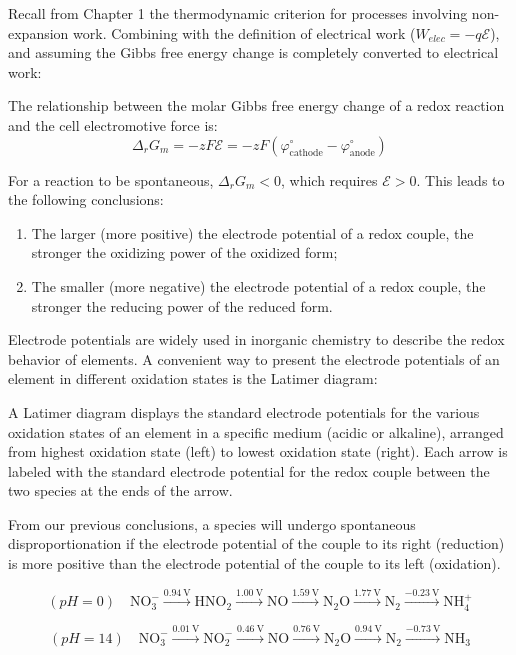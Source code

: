 Recall from Chapter 1 the thermodynamic criterion for processes involving non-expansion work. Combining with the definition of electrical work ($W_{elec} = -q\mathcal{E}$), and assuming the Gibbs free energy change is completely converted to electrical work:

\begin{proposition}
The relationship between the molar Gibbs free energy change of a redox reaction and the cell electromotive force is:
$$\Delta_r G_m = -zF\mathcal{E} = - z F \left( \varphi_{\text{cathode}}^\circ - \varphi_{\text{anode}}^\circ \right)$$

For a reaction to be spontaneous, $\Delta_r G_m < 0$, which requires $\mathcal{E} > 0$. This leads to the following conclusions:
\begin{enumerate}
  \item The larger (more positive) the electrode potential of a redox couple, the stronger the oxidizing power of the oxidized form;
  \item The smaller (more negative) the electrode potential of a redox couple, the stronger the reducing power of the reduced form.
\end{enumerate}
\end{proposition}

Electrode potentials are widely used in inorganic chemistry to describe the redox behavior of elements. A convenient way to present the electrode potentials of an element in different oxidation states is the Latimer diagram:

\begin{definition}
A Latimer diagram displays the standard electrode potentials for the various oxidation states of an element in a specific medium (acidic or alkaline), arranged from highest oxidation state (left) to lowest oxidation state (right). Each arrow is labeled with the standard electrode potential for the redox couple between the two species at the ends of the arrow.

From our previous conclusions, a species will undergo spontaneous disproportionation if the electrode potential of the couple to its right (reduction) is more positive than the electrode potential of the couple to its left (oxidation).
\end{definition}

\begin{example}
  $$
(pH = 0)\quad\text{NO}_3^- \xrightarrow{0.94\ \text{V}} 
\text{HNO}_2 \xrightarrow{1.00\ \text{V}} 
\text{NO} \xrightarrow{1.59\ \text{V}} 
\text{N}_2\text{O} \xrightarrow{1.77\ \text{V}} 
\text{N}_2 \xrightarrow{-0.23\ \text{V}} 
\text{NH}_4^+
$$

$$
(pH =14)\quad\text{NO}_3^- \xrightarrow{0.01\ \text{V}} 
\text{NO}_2^- \xrightarrow{0.46\ \text{V}} 
\text{NO} \xrightarrow{0.76\ \text{V}} 
\text{N}_2\text{O} \xrightarrow{0.94\ \text{V}} 
\text{N}_2 \xrightarrow{-0.73\ \text{V}} 
\text{NH}_3
$$

\end{example}

